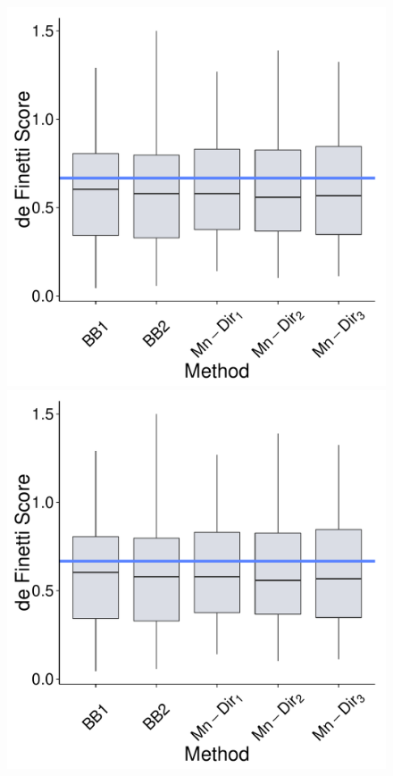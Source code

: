 \documentclass[journal,article,accept,moreauthors,pdftex,12pt,a4paper]{mdpi}
\begin{document}
\begin{figure}[H]
  \centering
\includegraphics[page=1,scale=0.3]{futebolComparacaoModelosForPaper.pdf}
\includegraphics[page=2,scale=0.3]{futebolComparacaoModelosForPaper.pdf}\\

\end{figure}
\end{document}
